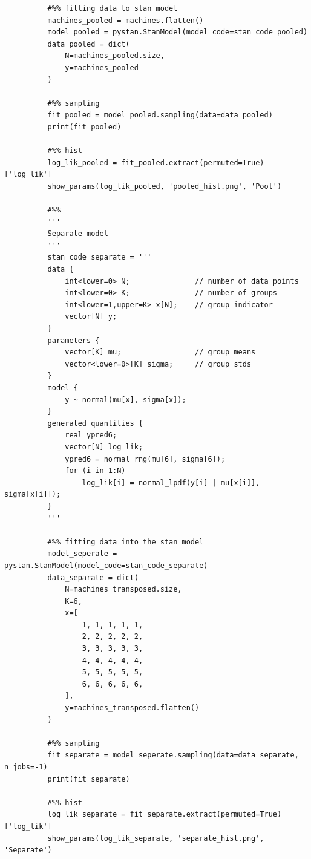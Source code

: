 \documentclass[11pt,a4paper,english]{article}
\begin{document}
\begin{appendices}
\begin{verbatim}
          #%% fitting data to stan model
          machines_pooled = machines.flatten()
          model_pooled = pystan.StanModel(model_code=stan_code_pooled)
          data_pooled = dict(
              N=machines_pooled.size,
              y=machines_pooled
          )

          #%% sampling
          fit_pooled = model_pooled.sampling(data=data_pooled)
          print(fit_pooled)

          #%% hist
          log_lik_pooled = fit_pooled.extract(permuted=True)['log_lik']
          show_params(log_lik_pooled, 'pooled_hist.png', 'Pool')

          #%%
          '''
          Separate model
          '''
          stan_code_separate = '''
          data {
              int<lower=0> N;               // number of data points
              int<lower=0> K;               // number of groups
              int<lower=1,upper=K> x[N];    // group indicator
              vector[N] y;
          }
          parameters {
              vector[K] mu;                 // group means
              vector<lower=0>[K] sigma;     // group stds
          }
          model {
              y ~ normal(mu[x], sigma[x]);
          }
          generated quantities {
              real ypred6;
              vector[N] log_lik;
              ypred6 = normal_rng(mu[6], sigma[6]);
              for (i in 1:N)
                  log_lik[i] = normal_lpdf(y[i] | mu[x[i]], sigma[x[i]]);
          }
          '''

          #%% fitting data into the stan model
          model_seperate = pystan.StanModel(model_code=stan_code_separate)
          data_separate = dict(
              N=machines_transposed.size,
              K=6,
              x=[
                  1, 1, 1, 1, 1,
                  2, 2, 2, 2, 2,
                  3, 3, 3, 3, 3,
                  4, 4, 4, 4, 4,
                  5, 5, 5, 5, 5,
                  6, 6, 6, 6, 6,
              ],
              y=machines_transposed.flatten()
          )

          #%% sampling
          fit_separate = model_seperate.sampling(data=data_separate, n_jobs=-1)
          print(fit_separate)

          #%% hist
          log_lik_separate = fit_separate.extract(permuted=True)['log_lik']
          show_params(log_lik_separate, 'separate_hist.png', 'Separate')


\end{verbatim}
\end{appendices}
\end{document}
